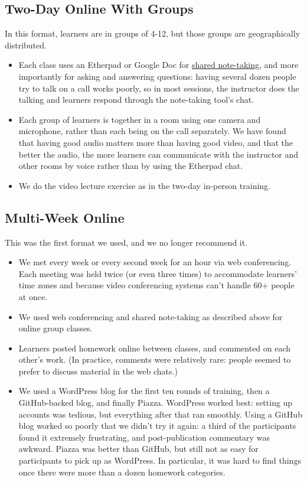 \documentclass[10pt,statementpaper]{memoir}
\begin{document}
\subsection*{Two-Day Online With
Groups}\label{two-day-online-with-groups}

In this format, learners are in groups of 4-12, but those groups are
geographically distributed.

\begin{itemize}
\item
  Each class uses an Etherpad or Google Doc for
  \href{practices.html\#take-notes-together}{shared note-taking}, and
  more importantly for asking and answering questions: having several
  dozen people try to talk on a call works poorly, so in most sessions,
  the instructor does the talking and learners respond through the
  note-taking tool's chat.
\item
  Each group of learners is together in a room using one camera and
  microphone, rather than each being on the call separately. We have
  found that having good audio matters more than having good video, and
  that the better the audio, the more learners can communicate with the
  instructor and other rooms by voice rather than by using the Etherpad
  chat.
\item
  We do the video lecture exercise as in the two-day in-person training.
\end{itemize}

\subsection*{Multi-Week Online}\label{multi-week-online}

This was the first format we used, and we no longer recommend it.

\begin{itemize}
\item
  We met every week or every second week for an hour via web
  conferencing. Each meeting was held twice (or even three times) to
  accommodate learners' time zones and because video conferencing
  systems can't handle 60+ people at once.
\item
  We used web conferencing and shared note-taking as described above for
  online group classes.
\item
  Learners posted homework online between classes, and commented on each
  other's work. (In practice, comments were relatively rare: people
  seemed to prefer to discuss material in the web chats.)
\item
  We used a WordPress blog for the first ten rounds of training, then a
  GitHub-backed blog, and finally Piazza. WordPress worked best: setting
  up accounts was tedious, but everything after that ran smoothly. Using
  a GitHub blog worked so poorly that we didn't try it again: a third of
  the participants found it extremely frustrating, and post-publication
  commentary was awkward. Piazza was better than GitHub, but still not
  as easy for participants to pick up as WordPress. In particular, it
  was hard to find things once there were more than a dozen homework
  categories.
\end{itemize}
\end{document}
